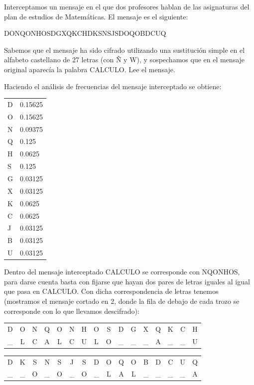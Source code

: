 \begin{problem}[5]
	Interceptamos un mensaje en el que dos profesores hablan de las asignaturas del plan de estudios de Matemáticas. El mensaje es el siguiente:

	DONQONHOSDGXQKCHDKSNSJSDOQOBDCUQ

	Sabemos que el mensaje ha sido cifrado utilizando una sustitución simple en el alfabeto castellano de 27 letras (con Ñ y W), y sospechamos que en el mensaje original aparecía la palabra CALCULO. Lee el mensaje.

	\solution

	Haciendo el análisis de frecuencias del mensaje interceptado se obtiene:

	\begin{center}
		\begin{tabular}{l l}
			D & 0.15625 \\
			O & 0.15625 \\
			N & 0.09375 \\
			Q & 0.125 \\
			H & 0.0625 \\
			S & 0.125 \\
			G & 0.03125 \\
			X & 0.03125 \\
			K & 0.0625 \\
			C & 0.0625 \\
			J & 0.03125 \\
			B & 0.03125 \\
			U & 0.03125
		\end{tabular}
	\end{center}

	Dentro del mensaje interceptado CALCULO se corresponde con NQONHOS, para darse cuenta basta con fijarse que hayan dos pares de letras iguales al igual que pasa en CALCULO. Con dicha correspondencia de letras tenemos (mostramos el mensaje cortado en 2, donde la fila de debajo de cada trozo se corresponde con lo que llevamos descifrado):

	\begin{center}
		\begin{tabular}{c c c c c c c c c c c c c c c c}
			D & O & N & Q & O & N & H & O & S & D & G & X & Q & K & C & H \\
			\_ & L & C & A & L & C & U & L & O & \_ & \_ & \_ & A & \_ & \_ & U
		\end{tabular}
	\end{center}

	\begin{center}
		\begin{tabular}{c c c c c c c c c c c c c c c c}
			D & K & S & N & S & J & S & D & O & Q & O & B & D & C & U & Q \\
			\_ & \_ & O & \_ & O & \_ & O & \_ & L & A & L & \_ & \_ & \_ & \_ & A
		\end{tabular}
	\end{center}


\end{problem}

